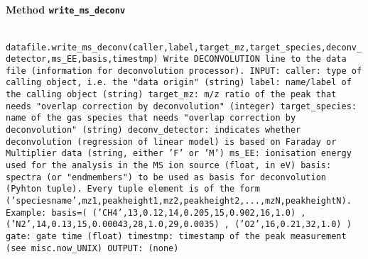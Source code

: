 \paragraph{Method \texttt{write_ms_deconv}}
\vspace{1ex}
\texttt{\newline
datafile.write_ms_deconv(caller,label,target_mz,target_species,deconv_detector,ms_EE,basis,timestmp)\newline
\newline
Write DECONVOLUTION line to the data file (information for deconvolution processor).\newline
\newline
INPUT:\newline
caller: type of calling object, i.e. the "data origin" (string)\newline
label: name/label of the calling object (string)\newline
target_mz: m/z ratio of the peak that needs "overlap correction by deconvolution" (integer)\newline
target_species: name of the gas species that needs "overlap correction by deconvolution" (string)\newline
deconv_detector: indicates whether deconvolution (regression of linear model) is based on Faraday or Multiplier data (string, either 'F' or 'M')\newline
ms_EE: ionisation energy used for the analysis in the MS ion source (float, in eV)\newline
basis: spectra (or "endmembers") to be used as basis for deconvolution (Pyhton tuple). Every tuple element is of the form ('speciesname',mz1,peakheight1,mz2,peakheight2,...,mzN,peakheightN). Example: basis=( ('CH4',13,0.12,14,0.205,15,0.902,16,1.0) , ('N2',14,0.13,15,0.00043,28,1.0,29,0.0035) , ('O2',16,0.21,32,1.0) )\newline
\newline
gate: gate time (float)\newline
timestmp: timestamp of the peak measurement (see misc.now_UNIX)\newline
\newline
OUTPUT:\newline
(none)\newline
\newline
}

